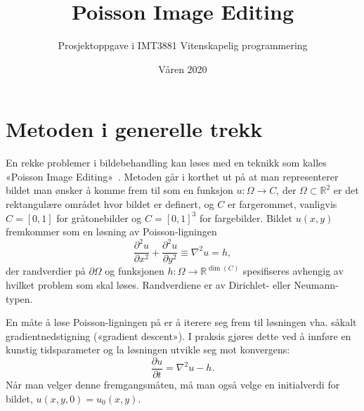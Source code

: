 \documentclass[11pt,a4paper]{article}
\begin{document}
\title{Poisson Image Editing}
\author{Prosjektoppgave i IMT3881 Vitenskapelig programmering}
\date{Våren 2020}

\maketitle

\section{Metoden i generelle trekk}

En rekke problemer i bildebehandling kan løses med en teknikk som kalles «Poisson Image Editing»~\cite{Perez:03}. Metoden går i korthet ut på at man representerer bildet man ønsker å komme frem til som en funksjon $u : \Omega \to C$, der $\Omega \subset \mathbb{R}^2$ er det rektangulære området hvor bildet er definert, og $C$ er fargerommet, vanligvis $C = [0, 1]$ for gråtonebilder og $C = [0, 1]^3$ for fargebilder. Bildet $u(x, y)$ fremkommer som en løsning av Poisson-ligningen
$$
\frac{\partial^2 u}{\partial x^2} + \frac{\partial^2 u}{\partial y^2} \equiv \nabla^2 u = h,
$$
der randverdier på $\partial\Omega$ og funksjonen $h : \Omega \to \mathbb{R}^{\dim(C)}$ spesifiseres avhengig av hvilket problem som skal løses. Randverdiene er av Dirichlet- eller Neumann-typen.

En måte å løse Poisson-ligningen på er å iterere seg frem til løsningen vha. såkalt gradientnedstigning («gradient descent»). I praksis gjøres dette ved å innføre en kunstig tidsparameter og la løsningen utvikle seg mot konvergens:
\begin{equation}
\frac{\partial u}{\partial t} = \nabla^2 u - h.
\label{eq:diffusjon}
\end{equation}
Når man velger denne fremgangsmåten, må man også velge en initialverdi for bildet, $u(x, y, 0) = u_0(x, y)$.
\end{document}
